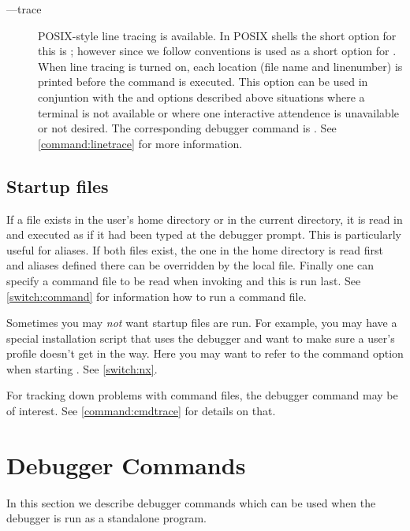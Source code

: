 \begin{description}
\item[--{}--trace]\label{switch:trace}

POSIX-style line tracing is available. In POSIX shells the short
option for this is ; however since we follow 
conventions  is used as a short option for
. When line tracing is turned on, each location (file
name and linenumber) is printed before the command is executed. This
option can be used in conjuntion with the  and
 options described above situations where a terminal is
not available or where one interactive attendence is unavailable or
not desired. The corresponding debugger command is . See \ref{command:linetrace} for more information.

\end{description}

\subsection{Startup files\label{subsection:startup-files}}

If a file 
 exists
in the user's home directory or in the current directory, it is read
in and executed as if it had been typed at the debugger prompt.  This
is particularly useful for aliases.  If both files exist, the one in
the home directory is read first and aliases defined there can be
overridden by the local file. Finally one can specify a command file
to be read when invoking  and this is run last. See
\ref{switch:command} for information how to run a command file.

Sometimes you may \emph{not} want startup files are run. For example,
you may have a special installation script that uses the debugger and
want to make sure a user's profile doesn't get in the way. Here you
may want to refer to the  command option when starting
. See \ref{switch:nx}.

For tracking down problems with command files, the  debugger command may be of interest. See
\ref{command:cmdtrace} for details on that.

\section{Debugger Commands \label{command:debuggers}}

In this section we describe debugger commands which can be used when
the debugger is run as a standalone program.

